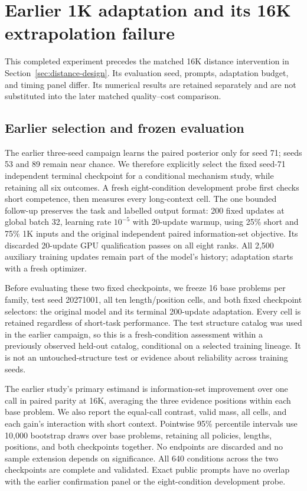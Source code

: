 \section{Earlier 1K adaptation and its 16K extrapolation failure}
\label{app:context-study}
This completed experiment precedes the matched 16K distance intervention in
Section~\ref{sec:distance-design}. Its evaluation seed, prompts, adaptation
budget, and timing panel differ. Its numerical results are retained separately
and are not substituted into the later matched quality--cost comparison.

\subsection{Earlier selection and frozen evaluation}
The earlier three-seed campaign learns the paired posterior only for seed 71;
seeds 53 and 89 remain near chance. We therefore explicitly select the fixed
seed-71 independent terminal checkpoint for a conditional mechanism study,
while retaining all six outcomes. A fresh eight-condition development probe
first checks short competence, then measures every long-context cell.
The one bounded follow-up preserves the task and labelled output format:
200 fixed updates at global batch 32, learning rate $10^{-5}$ with 20-update
warmup, using 25\% short and 75\% 1K inputs and the original independent paired
information-set objective. Its discarded 20-update GPU qualification passes
on all eight ranks. All 2,500 auxiliary training updates remain part of the
model's history; adaptation starts with a fresh optimizer.

Before evaluating these two fixed checkpoints, we freeze 16 base problems
per family, test seed 20271001, all ten length/position cells, and both fixed
checkpoint selectors: the original model and its terminal 200-update
adaptation. Every cell is retained regardless of short-task performance.
The test structure catalog was used in the earlier campaign, so this is a
fresh-condition assessment within a previously observed held-out catalog,
conditional on a selected training lineage. It is not an untouched-structure
test or evidence about reliability across training seeds.

The earlier study's primary estimand is information-set improvement over one call in paired
parity at 16K, averaging the three evidence positions within each base problem.
We also report the equal-call contrast, valid mass, all cells, and each gain's
interaction with short context. Pointwise 95\% percentile intervals use
10,000 bootstrap draws over base problems, retaining all policies, lengths,
positions, and both checkpoints together. No endpoints are discarded and no
sample extension depends on significance. All 640 conditions across the two checkpoints are complete and validated.
Exact public prompts have no overlap with the earlier confirmation panel
or the eight-condition development probe.

